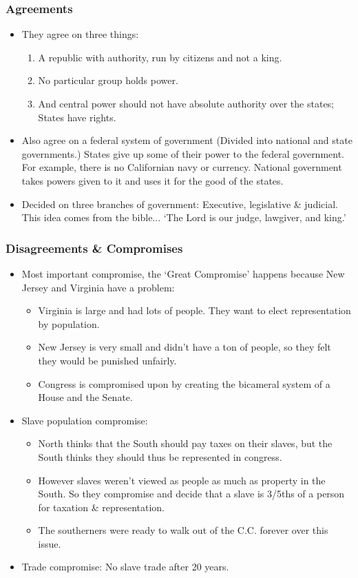 \documentclass{article}
\begin{document}
  \subsubsection{Agreements}
    \begin{itemize}
      \item They agree on three things:
        \begin{enumerate}
          \item A republic with authority, run by citizens and not a king.
          \item No particular group holds power.
          \item And central power should not have absolute authority over the states; States have rights. 
        \end{enumerate}
      \item Also agree on a federal system of government (Divided into national and state governments.)  States give up some of their power to the federal government. For example, there is no Californian navy or currency. National government takes powers given to it and uses it for the good of the states. 
      \item Decided on three branches of government: Executive, legislative \& judicial. This idea comes from the bible... `The Lord is our judge, lawgiver, and king.'
    \end{itemize}

  \subsubsection{Disagreements \& Compromises}
    \begin{itemize}
      \item Most important compromise, the `Great Compromise' happens because New Jersey and Virginia have a problem:
        \begin{itemize}
          \item Virginia is large and had lots of people. They want to elect representation by population.
          \item New Jersey is very small and didn't have a ton of people, so they felt they would be punished unfairly.
          \item Congress is compromised upon by creating the bicameral system of a House and the Senate.
        \end{itemize}
      \item Slave population compromise: 
        \begin{itemize}
          \item North thinks that the South should pay taxes on their slaves, but the South thinks they should thus be represented in congress. 
          \item However slaves weren't viewed as people as much as property in the South. So they compromise and decide that a slave is 3/5ths of a person for taxation \& representation.
          \item The southerners were ready to walk out of the C.C. forever over this issue.
        \end{itemize}
      \item Trade compromise: No slave trade after 20 years. 
    \end{itemize}
\end{document}
